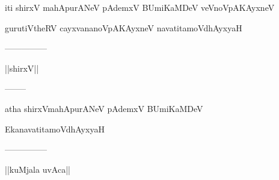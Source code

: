 \documentclass{article}
\begin{document}
\begin{center}
iti shirxV mahApurANeV pAdemxV BUmiKaMDeV veVnoVpAKAyxneV
\end{center}

\begin{center}
gurutiVtheRV cayxvananoVpAKAyxneV navatitamoVdhAyxyaH
\end{center}

\begin{center}
---------------
\end{center}

\begin{center}
||shirxV||
\end{center}

\begin{center}
--------
\end{center}

\begin{center}
atha shirxVmahApurANeV pAdemxV BUmiKaMDeV
\end{center}

\begin{center}
EkanavatitamoVdhAyxyaH
\end{center}

\begin{center}
---------------
\end{center}

\begin{center}
||kuMjala uvAca||
\end{center}
\end{document}
